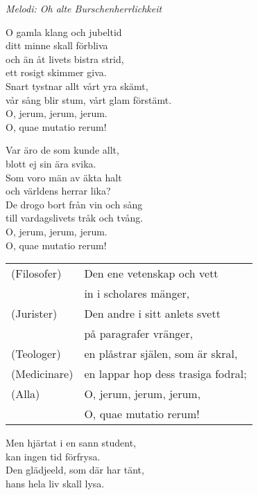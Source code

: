 {\footnotesize\textit{Melodi: Oh alte Burschenherrlichkeit}}\par
\vspace{10pt}
O gamla klang och jubeltid\\
ditt minne skall förbliva\\
och än åt livets bistra strid,\\
ett rosigt skimmer giva.\\
Snart tystnar allt vårt yra skämt,\\
vår sång blir stum, vårt glam förstämt.\\
O, jerum, jerum, jerum.\\
O, quae mutatio rerum!\par
\vspace{10pt}
Var äro de som kunde allt,\\
blott ej sin ära svika.\\
Som voro män av äkta halt\\
och världens herrar lika?\\
De drogo bort från vin och sång\\
till vardagslivets tråk och tvång.\\
O, jerum, jerum, jerum.\\
O, quae mutatio rerum!\par
\vspace{10pt}
\begin{leftborder}
\begin{tabular}{l l}
  (Filosofer)  & Den ene vetenskap och vett\\		
               & in i scholares mänger,\\
  (Jurister)   & Den andre i sitt anlets svett\\
               & på paragrafer vränger,\\
  (Teologer)   & en plåstrar själen, som är skral,\\
  (Medicinare) & en lappar hop dess trasiga fodral;\\
  (Alla)       & O, jerum, jerum, jerum,\\
               & O, quae mutatio rerum!
\end{tabular}
\end{leftborder}
\newpage
Men hjärtat i en sann student,\\
kan ingen tid förfrysa.\\
Den glädjeeld, som där har tänt,\\
hans hela liv skall lysa.\\
